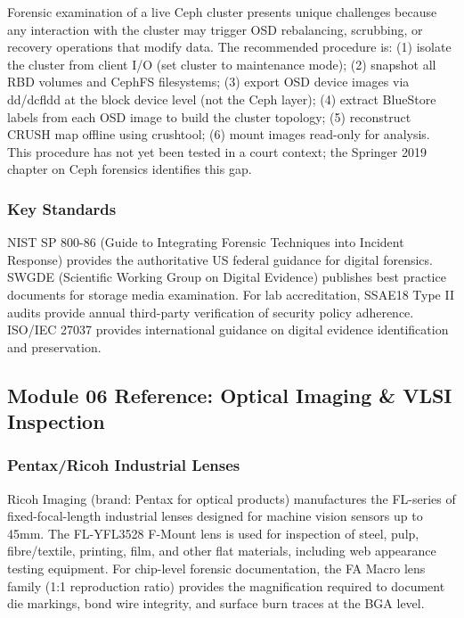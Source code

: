 \documentclass[11pt,letterpaper]{article}
\begin{document}
Forensic examination of a live Ceph cluster presents unique challenges because any interaction with the cluster may trigger OSD rebalancing, scrubbing, or recovery operations that modify data. The recommended procedure is: (1) isolate the cluster from client I/O (set cluster to maintenance mode); (2) snapshot all RBD volumes and CephFS filesystems; (3) export OSD device images via dd/dcfldd at the block device level (not the Ceph layer); (4) extract BlueStore labels from each OSD image to build the cluster topology; (5) reconstruct CRUSH map offline using crushtool; (6) mount images read-only for analysis. This procedure has not yet been tested in a court context; the Springer 2019 chapter on Ceph forensics identifies this gap.

\subsubsection{Key Standards}

NIST SP 800-86 (Guide to Integrating Forensic Techniques into Incident Response) provides the authoritative US federal guidance for digital forensics. SWGDE (Scientific Working Group on Digital Evidence) publishes best practice documents for storage media examination. For lab accreditation, SSAE18 Type II audits provide annual third-party verification of security policy adherence. ISO/IEC 27037 provides international guidance on digital evidence identification and preservation.

\subsection{Module 06 Reference: Optical Imaging \& VLSI Inspection}

\subsubsection{Pentax/Ricoh Industrial Lenses}

Ricoh Imaging (brand: Pentax for optical products) manufactures the FL-series of fixed-focal-length industrial lenses designed for machine vision sensors up to 45mm. The FL-YFL3528 F-Mount lens is used for inspection of steel, pulp, fibre/textile, printing, film, and other flat materials, including web appearance testing equipment. For chip-level forensic documentation, the FA Macro lens family (1:1 reproduction ratio) provides the magnification required to document die markings, bond wire integrity, and surface burn traces at the BGA level.
\end{document}
